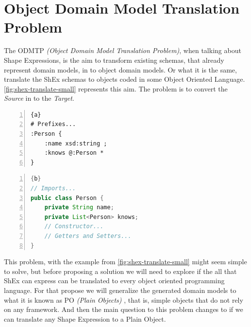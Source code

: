 \chapter{Object Domain Model Translation Problem}
\label{ch:odm-transl}

The ODMTP \textit{(Object Domain Model Translation Problem)}, when talking about
Shape Expressions, is the aim to transform existing schemas, that already represent
domain models, in to object domain models. Or what it is the same, translate the ShEx
schemas to objects coded in some Object Oriented Language. \cref{fig:shex-translate-small}
represents this aim. The problem is to convert the \textit{Source} in to the \textit{Target}.

\begin{center}
	\noindent\begin{minipage}[t]{.4\textwidth}
        \begin{lstlisting}[frame=topline,numbers=left,title=\scriptsize{Person Schema (Source)},
            basicstyle=\ttfamily\scriptsize]{a}
# Prefixes...
:Person {
	:name xsd:string ;
	:knows @:Person *
}
		\end{lstlisting}
	\end{minipage}\hfill
	\begin{minipage}[t]{.5\textwidth}
        \begin{lstlisting}[language=Java, frame=t,numbers=left,title=\scriptsize{Person Java Object (Target)},
            basicstyle=\ttfamily\scriptsize]{b}
// Imports...
public class Person {
	private String name;
	private List<Person> knows;
	// Constructor...
	// Getters and Setters...
}
		\end{lstlisting}
	\end{minipage}
	\label{fig:shex-translate-small}
\end{center}

This problem, with the example from \cref{fig:shex-translate-small} might seem simple to solve,
but before proposing a solution we will need to explore if the all that ShEx can express can be
translated to every object oriented programming language. For that propose we will generalize
the generated domain models to what it is known as PO \textit{(Plain Objects)} \cite{fowler1997analysis}, that is,
simple objects that do not rely on any framework. And then the main question to this problem changes to
if we can translate any Shape Expression to a Plain Object.

